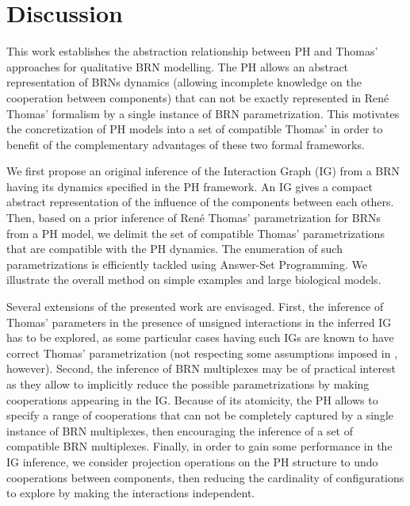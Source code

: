 \section{Discussion}

This work establishes the abstraction relationship between PH and Thomas' approaches for
qualitative BRN modelling.
The PH allows an abstract representation of BRNs dynamics (allowing incomplete knowledge on the
cooperation between components) that can not be exactly represented in Ren\'e Thomas' formalism by a
single instance of BRN parametrization.
This motivates the concretization of PH models into a set of compatible Thomas' in order to benefit
of the complementary advantages of these two formal frameworks.

We first propose an original inference of the Interaction Graph (IG) from a BRN
having its dynamics specified in the PH framework.
An IG gives a compact abstract representation of the influence of the components between each
others.
Then, based on a prior inference of Ren\'e Thomas' parametrization for BRNs from a PH model, we
delimit the set of compatible Thomas' parametrizations that are compatible with the PH dynamics.
The enumeration of such parametrizations is efficiently tackled using Answer-Set Programming.
We illustrate the overall method on simple examples and large biological models.

Several extensions of the presented work are envisaged.
First, the inference of Thomas' parameters in the presence of unsigned interactions in the
inferred IG has to be explored, as some particular cases having such IGs are known to have correct
Thomas' parametrization (not respecting some assumptions imposed in ,
however).
Second, the inference of BRN multiplexes \cite{BernotMultiplexes} may be of practical interest 
as they allow to implicitly reduce the possible parametrizations by making cooperations appearing
in the IG.
Because of its atomicity, the PH allows to specify a range of cooperations that can not be
completely captured by a single instance of BRN multiplexes, then encouraging the inference of a set
of compatible BRN multiplexes.
Finally, in order to gain some performance in the IG inference, we consider projection operations on
the PH structure to undo cooperations between components, then reducing the cardinality of
configurations to explore by making the interactions independent.

